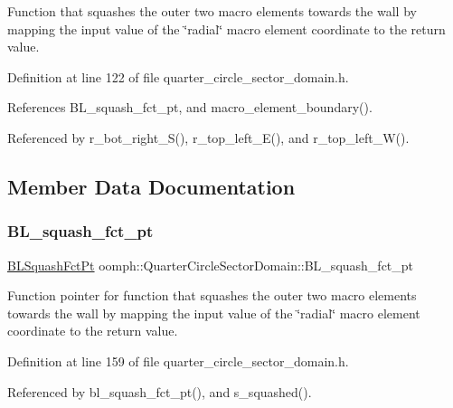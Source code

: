Function that squashes the outer two macro elements towards the wall by mapping the input value of the \char`\"{}radial\char`\"{} macro element coordinate to the return value. 



Definition at line 122 of file quarter\+\_\+circle\+\_\+sector\+\_\+domain.\+h.



References B\+L\+\_\+squash\+\_\+fct\+\_\+pt, and macro\+\_\+element\+\_\+boundary().



Referenced by r\+\_\+bot\+\_\+right\+\_\+\+S(), r\+\_\+top\+\_\+left\+\_\+\+E(), and r\+\_\+top\+\_\+left\+\_\+\+W().



\subsection{Member Data Documentation}
\mbox{\label{classoomph_1_1QuarterCircleSectorDomain_ae9b74ffcade9fdc1eeba26b4acced7a8}} 
\subsubsection{\texorpdfstring{B\+L\+\_\+squash\+\_\+fct\+\_\+pt}{BL\_squash\_fct\_pt}}
{\footnotesize\ttfamily \hyperlink{classoomph_1_1QuarterCircleSectorDomain_a6cffab57f87c9f4ab01744647240bb1e}{B\+L\+Squash\+Fct\+Pt} oomph\+::\+Quarter\+Circle\+Sector\+Domain\+::\+B\+L\+\_\+squash\+\_\+fct\+\_\+pt\hspace{0.3cm}{\ttfamily [private]}}



Function pointer for function that squashes the outer two macro elements towards the wall by mapping the input value of the \char`\"{}radial\char`\"{} macro element coordinate to the return value. 



Definition at line 159 of file quarter\+\_\+circle\+\_\+sector\+\_\+domain.\+h.



Referenced by bl\+\_\+squash\+\_\+fct\+\_\+pt(), and s\+\_\+squashed().

